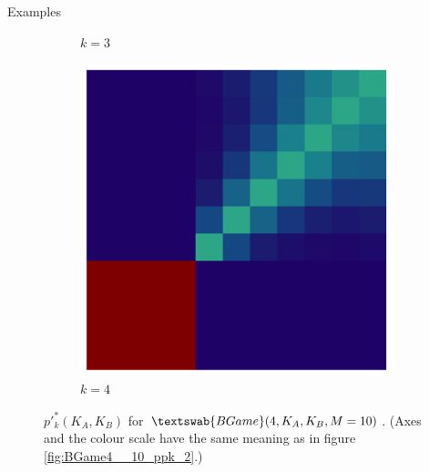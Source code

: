 \documentclass{beamer}
\theoremstyle{definition}
\newcommand{\BG}[1]{$\textswab{BGame}(#1)$}
\begin{document}
\begin{frame}[shrink=10]{Examples}
\begin{figure}[H]
\begin{subfigure}[b]{0.185\textwidth}
        \caption{$k=3$}
        \label{fig:ppkBG_4_3}
    \end{subfigure}
    \hspace{0.00\textwidth} %
        \begin{subfigure}[b]{0.185\textwidth}
        \includegraphics[width=\textwidth]{img/ppkB_Plot_4_4_10.png}
        \caption{$k=4$}
        \label{fig:ppkBG_4_4}
    \end{subfigure}

    \caption{\small \centering $p'^*_k(K_A,K_B)$ for \BG{4,K_A,K_B,M=10}.
    (Axes and the colour scale have the same meaning as in figure \ref{fig:BGame4__10_ppk_2}.)
    }
    \label{fig:ppk_InfBG_4_01234}
\end{figure}

\end{frame}
\end{document}
